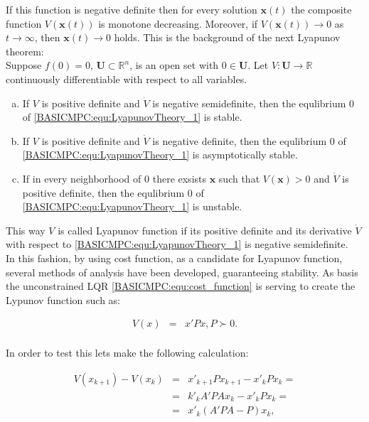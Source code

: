 		If this function is negative definite then for every solution $\boldsymbol{x}(t)$ the composite function $V(\boldsymbol{x}(t))$ is monotone decreasing. Moreover, if  $V(\boldsymbol{x}(t))\longrightarrow 0$ as $t\longrightarrow \infty$, then $\boldsymbol{x}(t)\longrightarrow 0$ holds. This is the background of the next Lyapunov theorem:\\
		Suppose $f(0)=0$, $\textbf{U}\subset\mathbb{R}^n$, is an open set with $0\in \textbf{U}$. Let $V:\textbf{U}\longrightarrow\mathbb{R}$ continuously differentiable with respect to all variables.
		\begin{enumerate}[a)] %
		\item If $V$ is positive definite and $\dot{V}$ is negative semidefinite, then the equlibrium $0$ of \ref{BASICMPC:equ:LyapunovTheory_1} is stable.
		\item If $V$ is positive definite and $\dot{V}$ is negative definite, then the equlibrium $0$ of \ref{BASICMPC:equ:LyapunovTheory_1} is asymptotically stable.
		\item If in every neighborhood of $0$ there exsists $\boldsymbol{x}$ such that $V(\boldsymbol{x})>0$ and $\dot{V}$ is positive definite, then the equlibrium $0$ of \ref{BASICMPC:equ:LyapunovTheory_1} is unstable.
\end{enumerate}

This way $V$ is called Lyapunov function if its positive definite and its derivative $\dot{V}$ with respect to \ref{BASICMPC:equ:LyapunovTheory_1} is negative semidefinite.\\
	In this fashion, by using cost function, as a candidate for Lyapunov function, several methods of analysis have been developed, guaranteeing stability.	As basis the unconstrained LQR \ref{BASICMPC:equ:cost_function} is serving to create the Lypunov function such as:
	
\begin{equation}
        \begin{array}{rcl}
				V(x)&=&x'Px, P\succ 0.\\
        \end{array}
        \label{BASICMPC:equ:stability_Lyapunov_1}
    \end{equation}
		
	In order to test this lets make the following calculation:
	
	\begin{equation}
        \begin{array}{rcl}
				V(x_{k+1})-V(x_{k})&=&x'_{k+1}Px_{k+1}-x'_{k}Px_{k}=\\
				&=&k'_kA'PAx_k-x'_kPx_k=\\
				&=&x'_k(A'PA-P)x_k,\\
        \end{array}
        \label{BASICMPC:equ:stability_Lyapunov_2}
    \end{equation}
		
